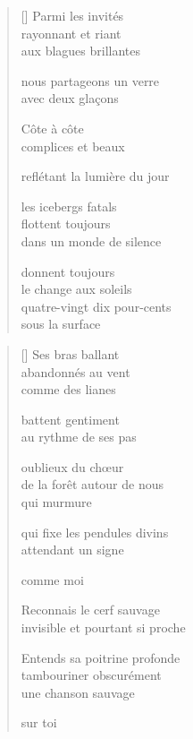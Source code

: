 \documentclass[12pt,a4paper]{article}
\begin{document}

\newpage

\poemtitle{}

\settowidth{\versewidth}{reflètant la lumière du jour}

\bigskip

\begin{verse}[\versewidth]
  Parmi les invités \\
  rayonnant et riant \\
  aux blagues brillantes

  nous partageons un verre \\
  avec deux glaçons

  Côte à côte \\
  complices et beaux

  reflétant la lumière du jour

  les icebergs fatals \\
  flottent toujours \\
  dans un monde de silence

  donnent toujours \\
  le change aux soleils \\
  quatre-vingt dix pour-cents \\
  sous la surface
\end{verse}


\newpage

\poemtitle{}

\settowidth{\versewidth}{invisible et pourtant si proche}

\bigskip

\begin{verse}[\versewidth]
  Ses bras ballant \\
  abandonnés au vent \\
  comme des lianes

  battent gentiment \\
  au rythme de ses pas

  oublieux du chœur \\
  de la forêt autour de nous \\
  qui murmure

  qui fixe les pendules divins \\
  attendant un signe

  comme moi

  Reconnais le cerf sauvage \\
  invisible et pourtant si proche

  Entends sa poitrine profonde \\
  tambouriner obscurément \\
  une chanson sauvage

  sur toi
\end{verse}
\end{document}

